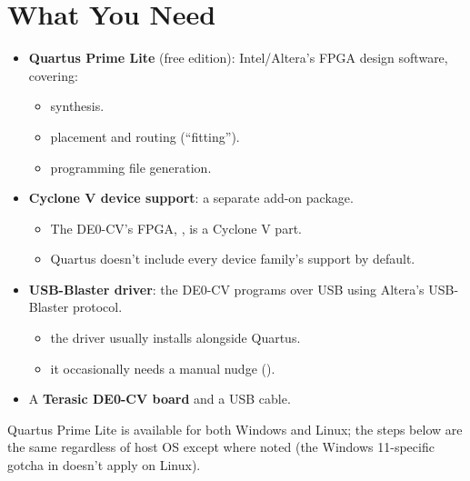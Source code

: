 \section{What You Need}
\label{q:1}
\begin{itemize}
  \item \textbf{Quartus Prime Lite} (free edition): Intel/Altera's FPGA design software, covering:
  \begin{itemize}
    \item synthesis.
    \item placement and routing (``fitting'').
    \item programming file generation.
  \end{itemize}
  \item \textbf{Cyclone V device support}: a separate add-on package.
  \begin{itemize}
    \item The DE0-CV's FPGA, , is a Cyclone V part.
    \item Quartus doesn't include every device family's support by default.
  \end{itemize}
  \item \textbf{USB-Blaster driver}: the DE0-CV programs over USB using Altera's USB-Blaster
    protocol.
  \begin{itemize}
    \item the driver usually installs alongside Quartus.
    \item it occasionally needs a manual nudge ().
  \end{itemize}
  \item A \textbf{Terasic DE0-CV board} and a USB cable.
\end{itemize}

Quartus Prime Lite is available for both Windows and Linux; the steps below are the same regardless
of host OS except where noted (the Windows 11-specific gotcha in  doesn't apply on
Linux).

